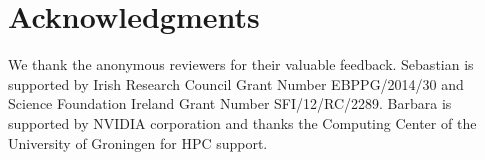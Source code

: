 \documentclass[11pt,a4paper]{article}
\begin{document}
\section*{Acknowledgments}

We thank the anonymous reviewers for their valuable feedback. Sebastian is supported by Irish Research Council Grant Number EBPPG/2014/30 and Science Foundation Ireland Grant Number SFI/12/RC/2289.
Barbara is supported by NVIDIA corporation and thanks the Computing Center of the University of Groningen for HPC support.



\end{document}
